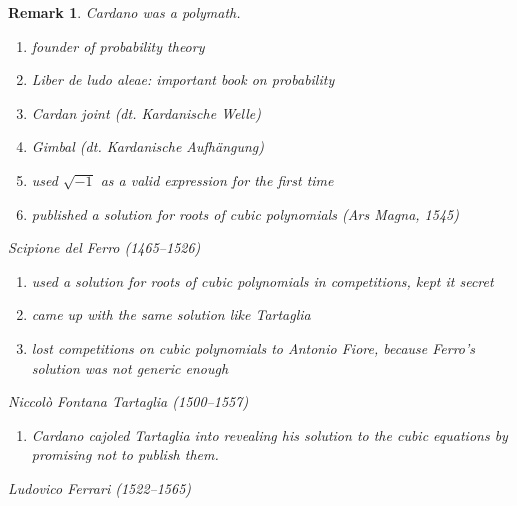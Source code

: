 \documentclass{article}
\newtheorem{remark}{Remark}  \numberwithin{remark}{section}
\begin{document}
\begin{remark}
  Cardano was a polymath.
  \begin{enumerate}
    \item founder of probability theory
    \item \emph{Liber de ludo aleae}: important book on probability
    \item Cardan joint (dt. \foreignlanguage{german}{Kardanische Welle})
    \item Gimbal (dt. \foreignlanguage{german}{Kardanische Aufh\"angung})
    \item used $\sqrt{-1}$ as a valid expression for the first time
    \item published a solution for roots of cubic polynomials (Ars Magna, 1545)
  \end{enumerate}

  Scipione del Ferro (1465--1526)

  \begin{enumerate}
    \item used a solution for roots of cubic polynomials in competitions, kept it secret
    \item came up with the same solution like Tartaglia
    \item lost competitions on cubic polynomials to Antonio Fiore, because Ferro's solution was not generic enough
  \end{enumerate}

  Niccol\`o Fontana Tartaglia (1500--1557)

  \begin{enumerate}
    \item Cardano cajoled Tartaglia into revealing his solution to the cubic equations by promising not to publish them.
  \end{enumerate}

  Ludovico Ferrari (1522--1565)
\end{remark}
\end{document}
